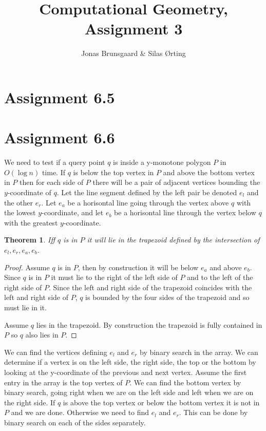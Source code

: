\documentclass[10pt,a4paper,final,oneside,openany,article]{memoir}
\title{Computational Geometry, Assignment 3}
\author{
    Jonas Brunsgaard \& Silas Ørting
}
\newtheorem{pinQ}{Theorem}
\begin{document}
\maketitle

\chapter*{Assignment 6.5}


\chapter*{Assignment 6.6}
We need to test if a query point $q$ is inside a y-monotone polygon $P$ in $O(\log n)$ time. If $q$ is below the top vertex in $P$ and above the bottom vertex in $P$ then for each side of $P$ there will be a pair of adjacent vertices bounding the $y$-coordinate of $q$. Let the line segment defined by the left pair be denoted $e_l$ and the other $e_r$. Let $e_a$ be a horisontal line going through the vertex above $q$ with the lowest $y$-coordinate, and let $e_b$ be a horisontal line through the vertex below $q$ with the greatest $y$-coordinate. 

\begin{pinQ}
  Iff $q$ is in $P$ it will lie in the trapezoid defined by the intersection of $e_l, e_r, e_a, e_b$.  
\end{pinQ}

\begin{proof}
  Assume $q$ is in $P$, then by construction it will be below $e_a$ and above $e_b$. Since $q$ is in $P$ it must lie to the right of the left side of $P$ and to the left of the right side of $P$. Since the left and right side of the trapezoid coincides with the left and right side of $P$, $q$ is bounded by the four sides of the trapezoid and so must lie in it.
  
  Assume $q$ lies in the trapezoid. By construction the trapezoid is fully contained in $P$ so $q$ also lies in $P$.
\end{proof}

We can find the vertices defining $e_l$ and $e_r$ by binary search in the array.
We can determine if a vertex is on the left side, the right side, the top or the bottom by looking at the y-coordinate of the previous and next vertex. 
Assume the first entry in the array is the top vertex of $P$. We can find the bottom vertex by binary search, going right when we are on the left side and left when we are on the right side. If $q$ is above the top vertex or below the bottom vertex it is not in $P$ and we are done. Otherwise we need to find $e_l$ and $e_r$. This can be done by binary search on each of the sides separately. 
\end{document}
